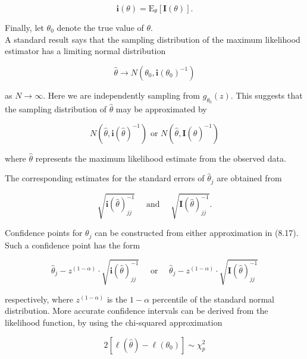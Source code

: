 \documentclass[10pt]{article}
\begin{document}
\begin{equation*}
\mathbf{i}(\theta)=\mathrm{E}_{\theta}[\mathbf{I}(\theta)] . \tag{8.15}
\end{equation*}


Finally, let $\theta_{0}$ denote the true value of $\theta$.\\
A standard result says that the sampling distribution of the maximum likelihood estimator has a limiting normal distribution


\begin{equation*}
\hat{\theta} \rightarrow N\left(\theta_{0}, \mathbf{i}\left(\theta_{0}\right)^{-1}\right) \tag{8.16}
\end{equation*}


as $N \rightarrow \infty$. Here we are independently sampling from $g_{\theta_{0}}(z)$. This suggests that the sampling distribution of $\hat{\theta}$ may be approximated by


\begin{equation*}
N\left(\hat{\theta}, \mathbf{i}(\hat{\theta})^{-1}\right) \text { or } N\left(\hat{\theta}, \mathbf{I}(\hat{\theta})^{-1}\right) \tag{8.17}
\end{equation*}


where $\hat{\theta}$ represents the maximum likelihood estimate from the observed data.

The corresponding estimates for the standard errors of $\hat{\theta}_{j}$ are obtained from


\begin{equation*}
\sqrt{\mathbf{i}(\hat{\theta})_{j j}^{-1}} \quad \text { and } \quad \sqrt{\mathbf{I}(\hat{\theta})_{j j}^{-1}} . \tag{8.18}
\end{equation*}


Confidence points for $\theta_{j}$ can be constructed from either approximation in (8.17). Such a confidence point has the form

$$
\hat{\theta}_{j}-z^{(1-\alpha)} \cdot \sqrt{\mathbf{i}(\hat{\theta})_{j j}^{-1}} \quad \text { or } \quad \hat{\theta}_{j}-z^{(1-\alpha)} \cdot \sqrt{\mathbf{I}(\hat{\theta})_{j j}^{-1}}
$$

respectively, where $z^{(1-\alpha)}$ is the $1-\alpha$ percentile of the standard normal distribution. More accurate confidence intervals can be derived from the likelihood function, by using the chi-squared approximation


\begin{equation*}
2\left[\ell(\hat{\theta})-\ell\left(\theta_{0}\right)\right] \sim \chi_{p}^{2} \tag{8.19}
\end{equation*}
\end{document}
